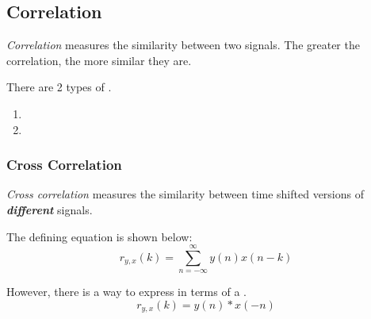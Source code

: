 \subsection{Correlation}\label{subsec:Correlation}
\begin{definition}[Correlation]\label{def:Correlation}
  \emph{Correlation} measures the similarity between two signals.
  The greater the correlation, the more similar they are.

  There are 2 types of .
  \begin{enumerate}[noitemsep]
  \item {}
  \item {}
  \end{enumerate}
\end{definition}

\subsubsection{Cross Correlation}\label{subsubsec:Cross_Correlation}
\begin{definition}\label{def:Cross_Correlation}
  \emph{Cross correlation} measures the similarity between time shifted versions of \textbf{\emph{different}} signals.

  The defining equation is shown below:
  \begin{equation}\label{eq:Cross_Correlation}
    r_{y,x}(k) = \sum\limits_{n=-\infty}^{\infty} y(n) x(n-k)
  \end{equation}

  However, there is a way to express  in terms of a .
  \begin{equation}\label{eq:Cross_Correlation-Convolution}
    r_{y,x}(k) = y(n) * x(-n)
  \end{equation}
\end{definition}

